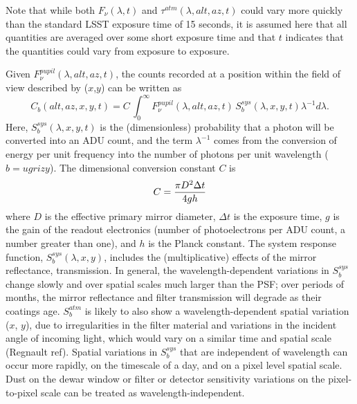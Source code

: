 \documentclass[12pt,preprint]{aastex}
\begin{document}
Note that while both $F_\nu(\lambda,t)$ and $\tau^{atm}(\lambda,alt,az,t)$ 
could vary more quickly than the standard LSST exposure time of 15
seconds, it is assumed here that all quantities are averaged over some
short exposure time and that $t$ indicates that the quantities could
vary from exposure to exposure. 

Given $F_\nu^{pupil}(\lambda,alt,az,t)$, the counts recorded at a
position within the field of view described by ($x$,$y$) can be
written as
\begin{equation}
\label{eqn:Fpupil2counts}
    C_b(alt,az,x,y,t) = C \, \int_0^\infty {F_\nu^{pupil}(\lambda,alt,az,t) \, S_b^{sys}(\lambda,x,y,t) \lambda^{-1}d\lambda}.
\end{equation}
Here, $S_b^{sys}(\lambda,x,y,t)$ is the (dimensionless) probability
that a photon will be converted into an ADU count, and the term
$\lambda^{-1}$ comes from the conversion of energy per unit frequency
into the number of photons per unit wavelength ($b=ugrizy$). The
dimensional conversion constant $C$ is
\begin{equation}
\label{eqn:Cconstant}
        C = {\pi D^2 \Delta t \over 4 g h }  
\end{equation}
where $D$ is the effective primary mirror diameter, $\Delta t$ is the
exposure time, $g$ is the gain of the readout electronics (number of
photoelectrons per ADU count, a number greater than one), and $h$ is
the Planck constant. The system response function,
$S_b^{sys}(\lambda,x,y)$, includes the (multiplicative) effects of the
mirror reflectance, transmission. In general, the wavelength-dependent
variations in $S_b^{sys}$ change slowly and over spatial scales much
larger than the PSF; over periods of months, the mirror reflectance
and filter transmission will degrade as their coatings
age. $S_b^{atm}$ is likely to also show a wavelength-dependent spatial
variation ($x$, $y$), due to irregularities in the filter material and
variations in the incident angle of incoming light, which would vary
on a similar time and spatial scale (Regnault ref). Spatial variations
in $S_b^{sys}$ that are independent of wavelength can occur more
rapidly, on the timescale of a day, and on a pixel level spatial
scale. Dust on the dewar window or filter or detector sensitivity
variations on the pixel-to-pixel scale can be treated as
wavelength-independent. 
\end{document}
